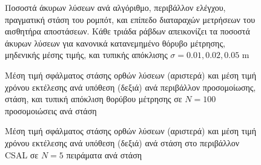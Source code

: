 \begin{figure}
  \hspace{-1.5cm}
  
  \vspace{-1cm}
\caption{\small Ποσοστά άκυρων λύσεων ανά αλγόριθμο, περιβάλλον ελέγχου,
         πραγματική στάση του ρομπότ, και επίπεδο διαταραχών μετρήσεων του
         αισθητήρα αποστάσεων. Κάθε τριάδα ράβδων απεικονίζει τα ποσοστά
         άκυρων λύσεων για κανονικά κατανεμημένο θόρυβο μέτρησης, μηδενικής
         μέσης τιμής, και τυπικής απόκλισης $\sigma = 0.01, 0.02, 0.05$ m}
\label{fig:02_03_04:outliers}
\end{figure}

\begin{figure}
  \hspace{-0.5cm}
  \begin{subfigure}{0.5\linewidth}
    
  \end{subfigure}\hspace{1.0cm}
  \begin{subfigure}{0.5\linewidth}
    
  \end{subfigure}
  \vspace{-2.5cm}
  \caption{\small Μέση τιμή σφάλματος στάσης ορθών λύσεων (αριστερά) και μέση
           τιμή χρόνου εκτέλεσης ανά υπόθεση (δεξιά) ανά περιβάλλον
           προσομοίωσης, στάση, και τυπική απόκλιση θορύβου μέτρησης σε $N=100$
           προσομοιώσεις ανά στάση}
\label{fig:02_03_04:sim_pose_errors_and_exec_times}
\end{figure}

\begin{figure}[h]
  \hspace{1cm}
  \begin{subfigure}{0.5\linewidth}
    
  \end{subfigure}%
  \begin{subfigure}{0.5\linewidth}
    
  \end{subfigure}
  \vspace{1cm}
\caption{\small Μέση τιμή σφάλματος στάσης ορθών λύσεων (αριστερά) και μέση
         τιμή χρόνου εκτέλεσης ανά υπόθεση (δεξιά) ανά στάση στο περιβάλλον
         CSAL σε $N=5$ πειράματα ανά στάση}
\label{fig:02_03_04:csal_pose_errors_and_exec_times}
\end{figure}

